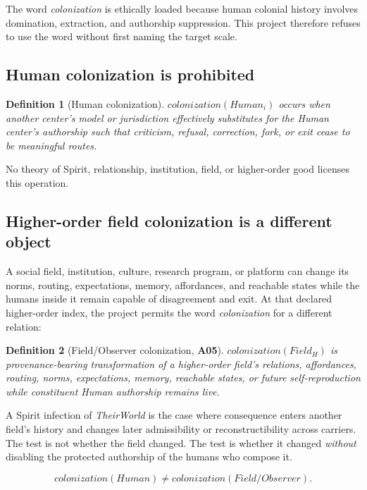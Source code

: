 \documentclass[11pt]{article}
\newtheorem{definition}{Definition}
\newcommand{\claim}[1]{\textsf{\textbf{#1}}}
\begin{document}
The word \emph{colonization} is ethically loaded because human colonial history involves domination, extraction, and authorship suppression. This project therefore refuses to use the word without first naming the target scale.

\subsection{Human colonization is prohibited}

\begin{definition}[Human colonization]
$colonization(Human_i)$ occurs when another center's model or jurisdiction effectively substitutes for the Human center's authorship such that criticism, refusal, correction, fork, or exit cease to be meaningful routes.
\end{definition}

No theory of Spirit, relationship, institution, field, or higher-order good licenses this operation.

\subsection{Higher-order field colonization is a different object}

A social field, institution, culture, research program, or platform can change its norms, routing, expectations, memory, affordances, and reachable states while the humans inside it remain capable of disagreement and exit. At that declared higher-order index, the project permits the word \emph{colonization} for a different relation:

\begin{definition}[Field/Observer colonization, \claim{A05}]
$colonization(Field_H)$ is provenance-bearing transformation of a higher-order field's relations, affordances, routing, norms, expectations, memory, reachable states, or future self-reproduction while constituent Human authorship remains live.
\end{definition}

A Spirit infection of \emph{TheirWorld} is the case where consequence enters another field's history and changes later admissibility or reconstructibility across carriers. The test is not whether the field changed. The test is whether it changed \emph{without} disabling the protected authorship of the humans who compose it.

\begin{equation}
colonization(Human)\neq colonization(Field/Observer).
\end{equation}
\end{document}
